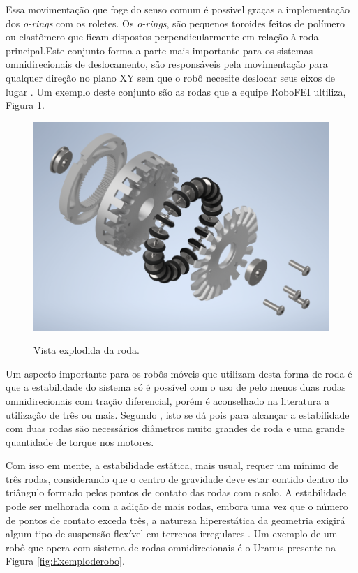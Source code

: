 \documentclass[deposito, acronym, symbols]{fei}
\begin{document}
Essa movimentação que foge do senso comum é possivel graças a implementação dos \textit{o-rings} com os roletes. Os \textit{o-rings}, são pequenos toroides feitos de polímero ou elastômero que ficam dispostos perpendicularmente em relação à roda principal.Este conjunto forma a parte mais importante para os sistemas omnidirecionais de deslocamento, são responsáveis pela movimentação para qualquer direção no plano XY sem que o robô necesite deslocar seus eixos de lugar \cite{kinematic}. Um exemplo deste conjunto são as rodas que a equipe RoboFEI ultiliza, Figura \ref{fig:rodaExplodida}.

\begin{figure}[!htb]
    \centering
    \caption{Vista explodida da roda.}
    \includegraphics[width=0.6\linewidth]{VistaExplodidaRodaMontada.png}
    \label{fig:rodaExplodida}
\end{figure}

Um aspecto importante para os robôs móveis que utilizam desta forma de roda é que a estabilidade do sistema só é possível com o uso de pelo menos duas rodas omnidirecionais com tração diferencial, porém é aconselhado na literatura a utilização de três ou mais. Segundo \textcite{siegwart2011introduction}, isto se dá pois para alcançar a estabilidade com duas rodas são necessários diâmetros muito grandes de roda e uma grande quantidade de torque nos motores.

Com isso em mente, a estabilidade estática, mais usual, requer um mínimo de três rodas, considerando que o centro de gravidade deve estar contido dentro do triângulo formado pelos pontos de contato das rodas com o solo. A estabilidade pode ser melhorada com a adição de mais rodas, embora uma vez que o número de pontos de contato exceda três, a natureza hiperestática da geometria exigirá algum tipo de suspensão flexível em terrenos irregulares \cite{siegwart2011introduction}. Um exemplo de um robô que opera com sistema de rodas omnidirecionais é o Uranus presente na Figura \ref{fig:Exemploderobo}.
\end{document}
